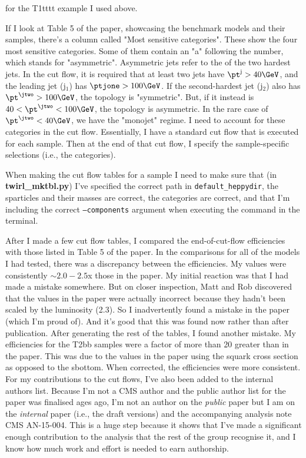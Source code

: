 for the T1tttt example I used above.

If I look at Table 5 of the paper, showcasing the benchmark models and their samples, there's a column called "Most sensitive \njet categories". These show the four most sensitive categories. Some of them contain an "a" following the number, which stands for "asymmetric". Asymmetric jets refer to the \pt of the two hardest jets. In the cut flow, it is required that at least two jets have $\pt^{\mathrm{j}} > 40\GeV$, and the leading jet (j$_1$) has $\ptjone > 100\GeV$. If the second-hardest jet (j$_2$) also has $\pt^{\jtwo} > 100\GeV$, the topology is "symmetric". But, if it instead is $40 < \pt^{\jtwo} < 100\GeV$, the topology is asymmetric. In the rare case of $\pt^{\jtwo} < 40\GeV$, we have the "monojet" regime. I need to account for these \njet categories in the cut flow. Essentially, I have a standard cut flow that is executed for each sample. Then at the end of that cut flow, I specify the sample-specific selections (i.e., the \njet categories).

When making the cut flow tables for a sample I need to make sure that (in \textbf{twirl\_mktbl.py}) I've specified the correct path in \texttt{default\_heppydir}, the sparticles and their masses are correct, the \njet categories are correct, and that I'm including the correct \texttt{--components} argument when executing the command in the terminal.

After I made a few cut flow tables, I compared the end-of-cut-flow efficiencies with those listed in Table 5 of the paper. In the comparisons for all of the models I had tested, there was a discrepancy between the efficiencies. My values were consistently $\sim 2.0-2.5$x those in the paper. My initial reaction was that I had made a mistake somewhere. But on closer inspection, Matt and Rob discovered that the values in the paper were actually incorrect because they hadn't been scaled by the luminosity (2.3\fbinv). So I inadvertently found a mistake in the paper (which I'm proud of). And it's good that this was found now rather than after publication. After generating the rest of the tables, I found another mistake. My efficiencies for the T2bb samples were a factor of more than 20 greater than in the paper. This was due to the values in the paper using the squark cross section as opposed to the sbottom. When corrected, the efficiencies were more consistent. For my contributions to the cut flows, I've also been added to the internal authors list. Because I'm not a CMS author and the public author list for the paper was finalised ages ago, I'm not an author on the \emph{public} paper but I am on the \emph{internal} paper (i.e., the draft versions) and the accompanying analysis note CMS AN-15-004. This is a huge step because it shows that I've made a significant enough contribution to the analysis that the rest of the group recognise it, and I know how much work and effort is needed to earn authorship.

